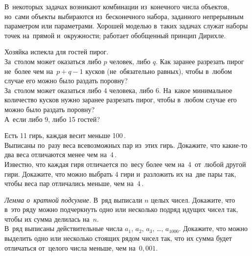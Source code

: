 



В~некоторых задачах возникают комбинации из~конечного числа объектов, но~сами
объекты выбираются из~бесконечного набора, заданного непрерывным параметром или
параметрами.
Хорошей моделью в~таких задачах служат наборы точек на~прямой и~окружности;
работает обобщенный принцип Дирихле.

\begin{exercises}

\item
Хозяйка испекла для гостей пирог.
\\
\subproblem
За~столом может оказаться либо $p$ человек, либо $q$.
Как заранее разрезать пирог не~более чем на~$p + q - 1$ кусков
(не~обязательно равных), чтобы в~любом случае его можно было раздать поровну?
\\
\subproblem
За~столом может оказаться либо $4$ человека, либо $6$.
На~какое минимальное количество кусков нужно заранее разрезать пирог, чтобы
в~любом случае его можно было раздать поровну?
\\
\subproblem
А~если либо 9, либо 15 гостей?

\item
Есть 11 гирь, каждая весит меньше 100\,.
\\
\subproblem
Выписаны по~разу веса всевозможных пар из~этих гирь.
Докажите, что какие-то два веса отличаются менее чем на~4\,.
\\
\subproblem
Известно, что каждая гиря отличается по~весу более чем на~4\,
от~любой другой гири.
Докажите, что можно выбрать 4 гири и~разложить их на~две пары так, чтобы веса
пар отличались меньше, чем на~4\,.

\item
\subproblem
\emph{Лемма о~кратной подсумме.}
В~ряд выписали $n$ целых чисел.
Докажите, что в~это ряду можно подчеркнуть одно или несколько подряд идущих
чисел так, чтобы их сумма делилась на~$n$.
\\
\subproblem
В~ряд выписаны действительные числа
$a_{1}$, $a_{2}$, $a_{3}$, \ldots, $a_{1000}$.
Докажите, что можно выделить одно или несколько стоящих рядом чисел так, что их
сумма будет отличаться от~целого числа меньше, чем на~$0{,}001$.

\end{exercises}

